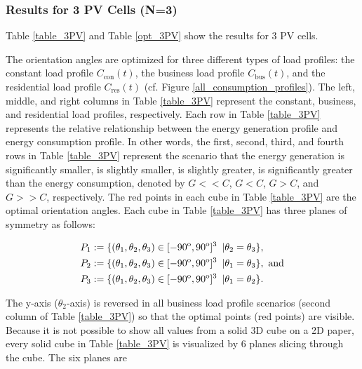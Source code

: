 \newpage


\subsubsection{Results for 3 PV Cells (N=3) \label{results_3PV}}

Table \ref{table_3PV} and Table \ref{opt_3PV} show the results for 3 PV cells.

The orientation angles are optimized for three different types of load profiles: the constant load profile $C_{\mathrm{con}}(t)$, the business load profile $C_{\mathrm{bus}}(t)$, and the residential load profile $C_{\mathrm{res}}(t)$ (cf. Figure \ref{all_consumption_profiles}). The left, middle, and right columns in Table \ref{table_3PV} represent the constant, business, and residential load profiles, respectively. Each row in Table \ref{table_3PV} represents the relative relationship between the energy generation profile and energy consumption profile. In other words, the first, second, third, and fourth rows in Table \ref{table_3PV} represent the scenario that the energy generation is significantly smaller, is slightly smaller, is slightly greater, is significantly greater than the energy consumption, denoted by $G<<C$, $G<C$, $G>C$, and $G>>C$, respectively. The red points in each cube in Table \ref{table_3PV} are the optimal orientation angles.
Each cube in Table \ref{table_3PV} has three planes of symmetry as follows:


\begin{align}
&P_1:= \{(\theta_1,\theta_2,\theta_3)\in [-90^\mathrm{o},90^\mathrm{o}]^3 \enskip|\theta_2=\theta_3\},\\ 
&P_2:= \{(\theta_1,\theta_2,\theta_3)\in [-90^\mathrm{o},90^\mathrm{o}]^3 \enskip |\theta_1=\theta_3\}, \text{ and}\\ 
&P_3:= \{(\theta_1,\theta_2,\theta_3)\in [-90^\mathrm{o},90^\mathrm{o}]^3 \enskip |\theta_1=\theta_2\}.
\end{align}

The y-axis ($\theta_2$-axis) is reversed in all business load profile scenarios (second column of Table \ref{table_3PV}) so that the optimal points (red points) are visible. Because it is not possible to show all values from a solid 3D cube on a 2D paper, every solid cube in Table \ref{table_3PV} is visualized by 6 planes slicing through the cube. The six planes are


